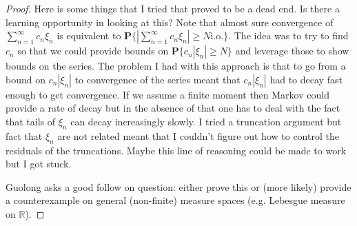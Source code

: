\documentclass{amsbook}
\theoremstyle{definition}
\theoremstyle{remark}
\newcommand{\probability}[1]{\textbf{P}\{#1\}}
\newcommand{\reals}{\mathbb{R}}
\newcommand{\abs}[1]{\left \vert #1 \right \vert}
\begin{document}
\begin{proof}
Here is some things that I tried that proved to be a dead end.  Is there
a learning opportunity in looking at this?  Note that almost sure
convergence of $\sum_{n=1}^\infty c_n \xi_n$ is equivalent to
$\probability{\abs{\sum_{n=1}^\infty c_n \xi_n} \geq N \text{
    i.o.}}$.  The idea was to try to find $c_n$ so that we could
provide bounds on $\probability{c_n\abs{\xi_n} \geq N}$ and leverage
those to show bounds on the series.  The problem I had with this
approach is that to go from a bound on $c_n\abs{\xi_n}$ to convergence
of the series meant that $c_n\abs{\xi_n}$ had to decay fast enough to
get convergence.  If we assume a finite moment then Markov could
provide a rate of decay but in the absence of that one has to deal
with the fact that tails of $\xi_n$ can decay increasingly slowly.
I tried a truncation argument but fact that $\xi_n$ are not related
meant that I couldn't figure out how to control the residuals of the
truncations.  Maybe this line of reasoning could be made to work but I
got stuck.

Guolong asks a good follow on question: either prove this or (more
likely) provide a
counterexample on general (non-finite) measure spaces (e.g. Lebesgue measure on $\reals$).
\end{proof}
\end{document}
